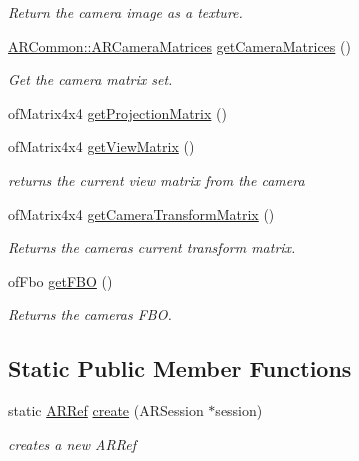 \begin{DoxyCompactItemize}
\begin{DoxyCompactList}\small\item\em Return the camera image as a texture. \end{DoxyCompactList}\item 
\hyperlink{struct_a_r_common_1_1_a_r_camera_matrices}{A\+R\+Common\+::\+A\+R\+Camera\+Matrices} \hyperlink{class_a_r_processor_a82a9b334360ebccd844e7cf5584eff8b}{get\+Camera\+Matrices} ()
\begin{DoxyCompactList}\small\item\em Get the camera matrix set. \end{DoxyCompactList}\item 
of\+Matrix4x4 \hyperlink{class_a_r_processor_a0f7cf764c73a8fc3964be088156766ea}{get\+Projection\+Matrix} ()
\item 
of\+Matrix4x4 \hyperlink{class_a_r_processor_a2e1d4cde9029bad28ac797c94e73096a}{get\+View\+Matrix} ()
\begin{DoxyCompactList}\small\item\em returns the current view matrix from the camera \end{DoxyCompactList}\item 
of\+Matrix4x4 \hyperlink{class_a_r_processor_aea093b6d054daa0c75de6f7a492a19ff}{get\+Camera\+Transform\+Matrix} ()
\begin{DoxyCompactList}\small\item\em Returns the camera\textquotesingle{}s current transform matrix. \end{DoxyCompactList}\item 
of\+Fbo \hyperlink{class_a_r_processor_a8436dc786e91fb933879d90a4ab396d5}{get\+F\+BO} ()
\begin{DoxyCompactList}\small\item\em Returns the camera\textquotesingle{}s F\+BO. \end{DoxyCompactList}\end{DoxyCompactItemize}
\subsection*{Static Public Member Functions}
\begin{DoxyCompactItemize}
\item 
static \hyperlink{_a_r_processor_8h_aa8c5643290d0692cc71388c3f0f1623a}{A\+R\+Ref} \hyperlink{class_a_r_processor_affa1cf36e94e3015c436fd30626dd773}{create} (A\+R\+Session $\ast$session)
\begin{DoxyCompactList}\small\item\em creates a new A\+R\+Ref \end{DoxyCompactList}\end{DoxyCompactItemize}
